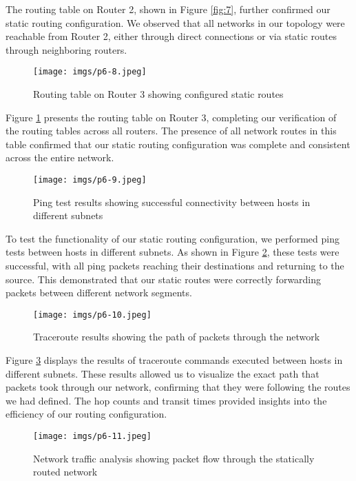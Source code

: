 \documentclass[twoside]{article}
\begin{document}
\begin{multicols}{2}
The routing table on Router 2, shown in Figure \ref{fig:7}, further confirmed our static routing configuration. We observed that all networks in our topology were reachable from Router 2, either through direct connections or via static routes through neighboring routers.

\begin{figure}[H]
    \centering
    \texttt{[image: imgs/p6-8.jpeg]}
    \caption{Routing table on Router 3 showing configured static routes}
    \label{fig:8}
\end{figure}

Figure \ref{fig:8} presents the routing table on Router 3, completing our verification of the routing tables across all routers. The presence of all network routes in this table confirmed that our static routing configuration was complete and consistent across the entire network.

\begin{figure}[H]
    \centering
    \texttt{[image: imgs/p6-9.jpeg]}
    \caption{Ping test results showing successful connectivity between hosts in different subnets}
    \label{fig:9}
\end{figure}

To test the functionality of our static routing configuration, we performed ping tests between hosts in different subnets. As shown in Figure \ref{fig:9}, these tests were successful, with all ping packets reaching their destinations and returning to the source. This demonstrated that our static routes were correctly forwarding packets between different network segments.

\begin{figure}[H]
    \centering
    \texttt{[image: imgs/p6-10.jpeg]}
    \caption{Traceroute results showing the path of packets through the network}
    \label{fig:10}
\end{figure}

Figure \ref{fig:10} displays the results of traceroute commands executed between hosts in different subnets. These results allowed us to visualize the exact path that packets took through our network, confirming that they were following the routes we had defined. The hop counts and transit times provided insights into the efficiency of our routing configuration.

\begin{figure}[H]
    \centering
    \texttt{[image: imgs/p6-11.jpeg]}
    \caption{Network traffic analysis showing packet flow through the statically routed network}
    \label{fig:11}
\end{figure}


\end{multicols}
\end{document}
